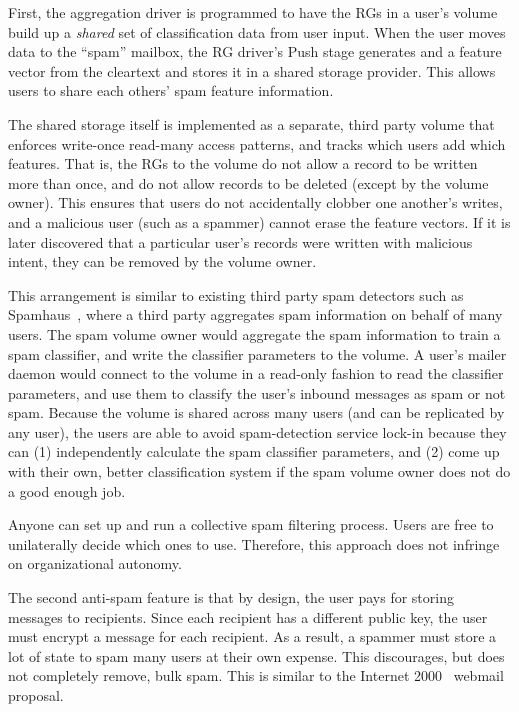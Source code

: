 First, the aggregation driver is programmed to have the RGs in a user's volume build
up a \emph{shared} set of classification data from user input.  When the user
moves data to the ``spam'' mailbox, the RG driver's Push stage generates and
a feature vector from the cleartext and stores it in a shared storage
provider.  This allows
users to share each others' spam feature information.

The shared storage itself is implemented as a separate, third party volume that enforces write-once read-many
access patterns, and tracks which users add which features.  That is, the RGs to the volume do not allow a record to be
written more than once, and do not allow records to be deleted (except by the
volume owner).  This ensures
that users do not accidentally clobber one another's writes, and a malicious
user (such as a spammer) cannot erase the feature vectors.  If it is later
discovered that a particular user's records were written with malicious intent,
they can be removed by the volume owner.

This arrangement is similar to existing third party spam detectors such as
Spamhaus~\cite{spamhaus}, where a third party aggregates spam information 
on behalf of many users.  The spam volume owner would aggregate the spam
information to train a spam classifier, and write the classifier parameters
to the volume.  A user's mailer daemon would connect to the volume in a read-only fashion
to read the classifier parameters, and use them to classify the user's inbound
messages as spam or not spam.  Because the volume is shared across many users
(and can be replicated by any user), the users are able to avoid spam-detection
service lock-in because they can (1) independently calculate the spam classifier
parameters, and (2) come up with their own, better classification system if the
spam volume owner does not do a good enough job.

Anyone can set up and run a collective spam filtering process.  Users are free
to unilaterally decide which ones to use.  Therefore, this approach does not
infringe on organizational autonomy.

\hfill \break
{}
\hfill \break

The second anti-spam feature is that by design, the user pays for storing messages to recipients.  Since each
recipient has a different public key, the user must encrypt a message for each
recipient.  As a result, a spammer
must store a lot of state to spam many users at their own expense.  This
discourages, but does not completely remove, bulk spam.  This is similar to
the Internet 2000~\cite{internet-mail-2000} webmail proposal.

